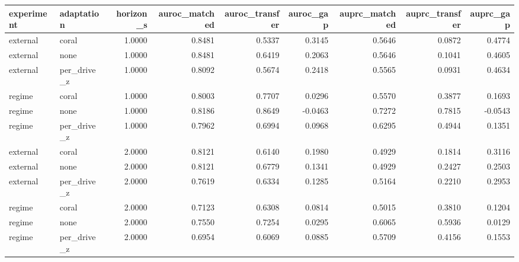 \begin{tabular}{llrrrrrrr}
\toprule
experiment & adaptation & horizon\_s & auroc\_matched & auroc\_transfer & auroc\_gap & auprc\_matched & auprc\_transfer & auprc\_gap \\
\midrule
external & coral & 1.0000 & 0.8481 & 0.5337 & 0.3145 & 0.5646 & 0.0872 & 0.4774 \\
external & none & 1.0000 & 0.8481 & 0.6419 & 0.2063 & 0.5646 & 0.1041 & 0.4605 \\
external & per\_drive\_z & 1.0000 & 0.8092 & 0.5674 & 0.2418 & 0.5565 & 0.0931 & 0.4634 \\
regime & coral & 1.0000 & 0.8003 & 0.7707 & 0.0296 & 0.5570 & 0.3877 & 0.1693 \\
regime & none & 1.0000 & 0.8186 & 0.8649 & -0.0463 & 0.7272 & 0.7815 & -0.0543 \\
regime & per\_drive\_z & 1.0000 & 0.7962 & 0.6994 & 0.0968 & 0.6295 & 0.4944 & 0.1351 \\
external & coral & 2.0000 & 0.8121 & 0.6140 & 0.1980 & 0.4929 & 0.1814 & 0.3116 \\
external & none & 2.0000 & 0.8121 & 0.6779 & 0.1341 & 0.4929 & 0.2427 & 0.2503 \\
external & per\_drive\_z & 2.0000 & 0.7619 & 0.6334 & 0.1285 & 0.5164 & 0.2210 & 0.2953 \\
regime & coral & 2.0000 & 0.7123 & 0.6308 & 0.0814 & 0.5015 & 0.3810 & 0.1204 \\
regime & none & 2.0000 & 0.7550 & 0.7254 & 0.0295 & 0.6065 & 0.5936 & 0.0129 \\
regime & per\_drive\_z & 2.0000 & 0.6954 & 0.6069 & 0.0885 & 0.5709 & 0.4156 & 0.1553 \\
\bottomrule
\end{tabular}

